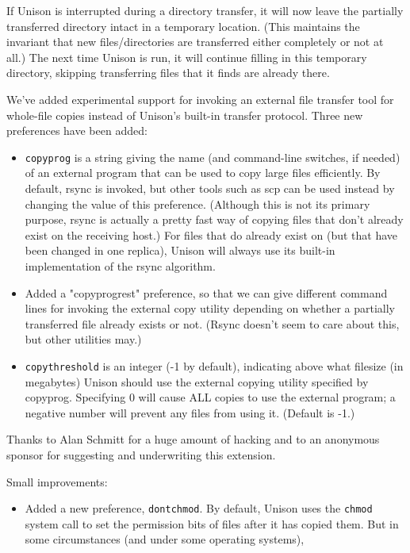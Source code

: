 \begin{changesfromversion}{2.27}
\item If Unison is interrupted during a directory transfer, it will now
leave the partially transferred directory intact in a temporary
location. (This maintains the invariant that new files/directories are
transferred either completely or not at all.)  The next time Unison is run,
it will continue filling in this temporary directory, skipping transferring
files that it finds are already there.
\item We've added experimental support for invoking an external file
transfer tool for whole-file copies instead of Unison's built-in transfer
protocol.  Three new preferences have been added:
\begin{itemize}
\item {\tt copyprog} is a string giving the name (and command-line
switches, if needed) of an external program that can be used to copy large
files efficiently.  By default, rsync is invoked, but other tools such as
scp can be used instead by changing the value of this preference.  (Although
this is not its primary purpose, rsync is actually a pretty fast way of
copying files that don't already exist on the receiving host.)  For files
that do already exist on (but that have been changed in one replica), Unison
will always use its built-in implementation of the rsync algorithm.
\item Added a "copyprogrest" preference, so that we can give different
command lines for invoking the external copy utility depending on whether a
partially transferred file already exists or not.  (Rsync doesn't seem to
care about this, but other utilities may.)
\item {\tt copythreshold} is an integer (-1 by default), indicating above what
filesize (in megabytes) Unison should use the external copying utility
specified by copyprog.  Specifying 0 will cause ALL copies to use the
external program; a negative number will prevent any files from using it.
(Default is -1.)
\end{itemize}
Thanks to Alan Schmitt for a huge amount of hacking and to an anonymous
sponsor for suggesting and underwriting this extension.
\item Small improvements:
\begin{itemize}
\item Added a new preference, {\tt dontchmod}.  By default, Unison uses the
{\tt chmod} system call to set the permission bits of files after it has
copied them.  But in some circumstances (and under some operating systems),

\end{itemize}
\end{changesfromversion}
